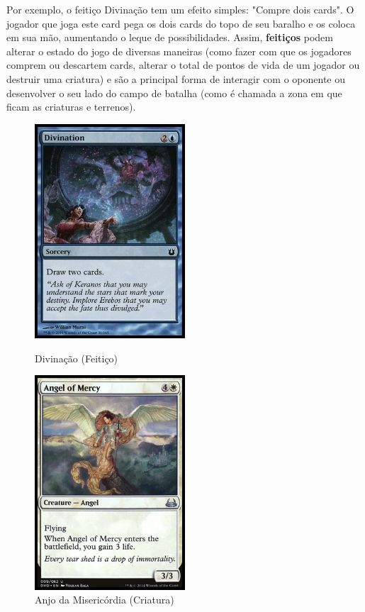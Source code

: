 \documentclass{book}
\begin{document}
Por exemplo, o feitiço Divinação tem um efeito simples: "Compre dois
cards". O jogador que joga este card pega os dois cards do topo de seu
baralho e os coloca em sua mão, aumentando o leque de possibilidades.
Assim, \textbf{feitiços} podem alterar o estado do jogo de diversas
maneiras (como fazer com que os jogadores comprem ou descartem cards,
alterar o total de pontos de vida de um jogador ou destruir uma
criatura) e são a principal forma de interagir com o oponente ou
desenvolver o seu lado do campo de batalha (como é chamada a zona em que
ficam as criaturas e terrenos).

\begin{figure}[!h]
    \centering
    \begin{minipage}{0.45\textwidth}
        \centering
        \includegraphics[width=0.5\textwidth]{picstcc/divination.jpg}
        \caption{Divinação (Feitiço)}
        \label{divination}
    \end{minipage}\hfill
    \begin{minipage}{0.45\textwidth}
        \centering
        \includegraphics[width=0.5\textwidth]{picstcc/angelOfMercy.jpg}
        \caption{Anjo da Misericórdia (Criatura)}
        \label{anjo}
    \end{minipage}
\end{figure}
\end{document}
